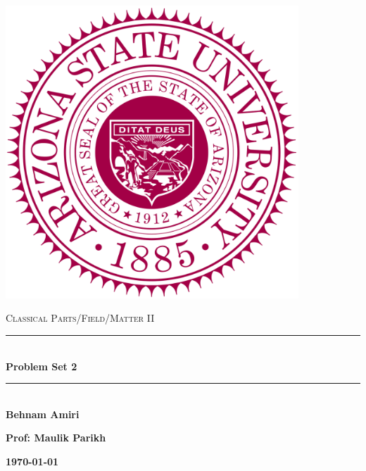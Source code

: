 \documentclass[fleqn]{article}
\begin{document}
  \begin{titlepage}

    \newcommand{\HRule}{\rule{\linewidth}{0.5mm}}

    \center

    \begin{center}
      \includegraphics[height=11cm, width=11cm]{asu.png}
    \end{center}

    \vline

    \textsc{\LARGE Classical Parts/Field/Matter II}\\[1.5cm]

    \HRule \\[0.5cm]
    { \huge \bfseries Problem Set 2}\\[0.4cm] 
    \HRule \\[1.0cm]

    \textbf{Behnam Amiri}

    \bigbreak

    \textbf{Prof: Maulik Parikh}

    \bigbreak

    \textbf{{\large \today}\\[2cm]}

    \vfill

  \end{titlepage}
\end{document}
